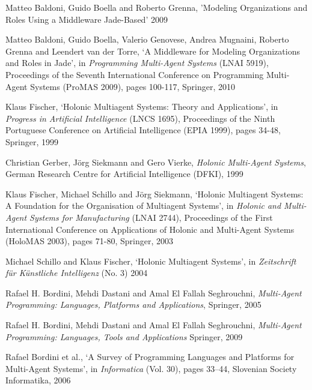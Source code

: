 \begin{thebibliography}{99}
Matteo Baldoni, Guido Boella and Roberto Grenna,
'Modeling Organizations and Roles Using a Middleware Jade-Based'
2009

Matteo Baldoni, Guido Boella, Valerio Genovese, Andrea Mugnaini, Roberto Grenna and Leendert van der Torre,
`A Middleware for Modeling Organizations and Roles in Jade',
in \textit{Programming Multi-Agent Systems} (LNAI 5919),
Proceedings of the Seventh International Conference on Programming Multi-Agent Systems (ProMAS 2009),
pages 100-117, 
Springer, 2010


Klaus Fischer,
`Holonic Multiagent Systems: Theory and Applications',
in \textit{Progress in Artificial Intelligence} (LNCS 1695),
Proceedings of the Ninth Portuguese Conference on Artificial Intelligence (EPIA 1999),
pages 34-48,
Springer, 1999

Christian Gerber, J\"{o}rg Siekmann and Gero Vierke,
\textit{Holonic Multi-Agent Systems},
German Research Centre for Artificial Intelligence (DFKI), 1999

Klaus Fischer, Michael Schillo and J\"{o}rg Siekmann,
`Holonic Multiagent Systems: A Foundation for the Organisation of Multiagent Systems',
in \textit{Holonic and Multi-Agent Systems for Manufacturing} (LNAI 2744),
Proceedings of the First International Conference on Applications of Holonic and Multi-Agent Systems (HoloMAS 2003),
pages 71-80,
Springer, 2003

Michael Schillo and Klaus Fischer,
`Holonic Multiagent Systems',
in \textit{Zeitschrift für Künstliche Intelligenz} (No. 3)
2004


Rafael H. Bordini, Mehdi Dastani and Amal El Fallah Seghrouchni,
\textit{Multi-Agent Programming: Languages, Platforms and Applications},
Springer, 2005

Rafael H. Bordini, Mehdi Dastani and Amal El Fallah Seghrouchni,
\textit{Multi-Agent Programming: Languages, Tools and Applications}
Springer, 2009

Rafael Bordini et al.,
`A Survey of Programming Languages and Platforms for Multi-Agent Systems',
in \textit{Informatica} (Vol. 30),
pages 33–44,
Slovenian Society Informatika, 2006


\end{thebibliography}
